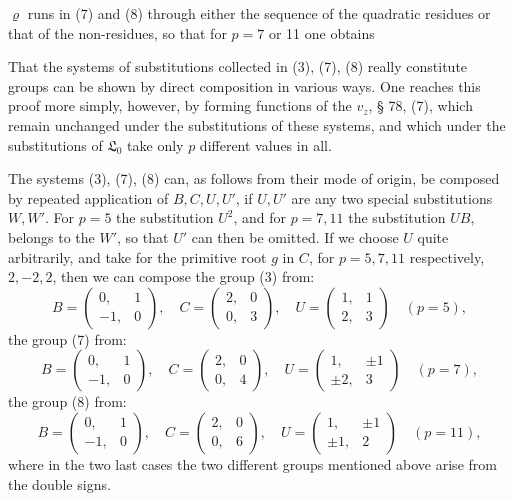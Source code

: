 
$\varrho$ runs in (7) and (8) through either the sequence of the quadratic residues or that of the non-residues, so that for $p = 7$ or 11 one obtains 

That the systems of substitutions collected in (3), (7), (8) really constitute groups can be shown by direct composition in various ways. One reaches this proof more simply, however, by forming functions of the $v_z$, § 78, (7), which remain unchanged under the substitutions of these systems, and which under the substitutions of $\mathfrak{L}_0$ take only $p$ different values in all.

The systems (3), (7), (8) can, as follows from their mode of origin, be composed by repeated application of $B, C, U, U'$, if $U, U'$ are any two special substitutions $W, W'$. For $p = 5$ the substitution $U^2$, and for $p = 7, 11$ the substitution $UB$, belongs to the $W'$, so that $U'$ can then be omitted. If we choose $U$ quite arbitrarily, and take for the primitive root $g$ in $C$, for $p = 5, 7, 11$ respectively, $2, -2, 2$, then we can compose the group (3) from:
\[
B = \begin{pmatrix} 0, & 1 \\ -1, & 0 \end{pmatrix}, \quad C = \begin{pmatrix} 2, & 0 \\ 0, & 3 \end{pmatrix}, \quad U = \begin{pmatrix} 1, & 1 \\ 2, & 3 \end{pmatrix} \quad (p = 5),
\]
the group (7) from:
\[
B = \begin{pmatrix} 0, & 1 \\ -1, & 0 \end{pmatrix}, \quad C = \begin{pmatrix} 2, & 0 \\ 0, & 4 \end{pmatrix}, \quad U = \begin{pmatrix} 1, & \pm 1 \\ \pm 2, & 3 \end{pmatrix} \quad (p = 7),
\]
the group (8) from:
\[
B = \begin{pmatrix} 0, & 1 \\ -1, & 0 \end{pmatrix}, \quad C = \begin{pmatrix} 2, & 0 \\ 0, & 6 \end{pmatrix}, \quad U = \begin{pmatrix} 1, & \pm 1 \\ \pm 1, & 2 \end{pmatrix} \quad (p = 11),
\]
where in the two last cases the two different groups mentioned above arise from the double signs.

